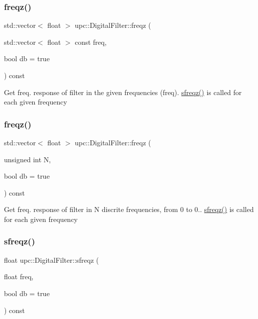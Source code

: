 \subsubsection{\texorpdfstring{freqz()}{freqz()}\hspace{0.1cm}{\footnotesize\ttfamily [1/2]}}
{\footnotesize\ttfamily std\+::vector$<$ float $>$ upc\+::\+Digital\+Filter\+::freqz (\begin{DoxyParamCaption}\item[{std\+::vector$<$ float $>$ const}]{freq,  }\item[{bool}]{db = {\ttfamily true} }\end{DoxyParamCaption}) const}

Get freq. response of filter in the given frequencies (freq). \hyperlink{classupc_1_1DigitalFilter_aee8d8470871b79ff465459ad0bedd833}{sfreqz()} is called for each given frequency \mbox{\label{classupc_1_1DigitalFilter_aaccd48246b8f0154725d40d43ae52268}} 
\subsubsection{\texorpdfstring{freqz()}{freqz()}\hspace{0.1cm}{\footnotesize\ttfamily [2/2]}}
{\footnotesize\ttfamily std\+::vector$<$ float $>$ upc\+::\+Digital\+Filter\+::freqz (\begin{DoxyParamCaption}\item[{unsigned int}]{N,  }\item[{bool}]{db = {\ttfamily true} }\end{DoxyParamCaption}) const}

Get freq. response of filter in N discrite frequencies, from 0 to 0.. \hyperlink{classupc_1_1DigitalFilter_aee8d8470871b79ff465459ad0bedd833}{sfreqz()} is called for each given frequency \mbox{\label{classupc_1_1DigitalFilter_aee8d8470871b79ff465459ad0bedd833}} 
\subsubsection{\texorpdfstring{sfreqz()}{sfreqz()}}
{\footnotesize\ttfamily float upc\+::\+Digital\+Filter\+::sfreqz (\begin{DoxyParamCaption}\item[{float}]{freq,  }\item[{bool}]{db = {\ttfamily true} }\end{DoxyParamCaption}) const}

